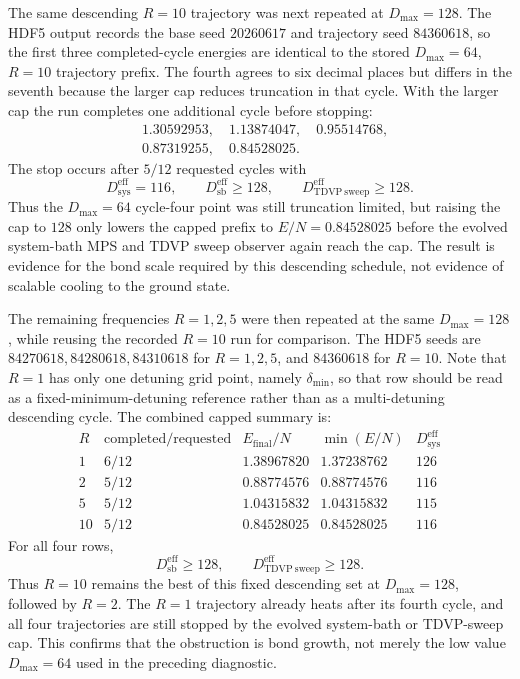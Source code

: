 \documentclass[aps,pra,twocolumn,superscriptaddress,nolongbibliography,nobalancelastpage,10pt]{revtex4-2}
\begin{document}
The same descending \(R=10\) trajectory was next repeated at
\(D_{\max}=128\).  The HDF5 output records the base seed \(20260617\) and
trajectory seed \(84360618\), so the first three completed-cycle energies are
identical to the stored \(D_{\max}=64\), \(R=10\) trajectory prefix.  The
fourth agrees to six decimal places but differs in the seventh because the
larger cap reduces truncation in that cycle.  With the larger cap the run
completes one additional cycle before stopping:
\[
\begin{aligned}
	&1.30592953,\quad 1.13874047,\quad 0.95514768,\\
	&0.87319255,\quad 0.84528025 .
\end{aligned}
\]
The stop occurs after \(5/12\) requested cycles with
\[
	D_{\mathrm{sys}}^{\mathrm{eff}}=116,\qquad
	D_{\mathrm{sb}}^{\mathrm{eff}}\geq 128,\qquad
	D_{\mathrm{TDVP\ sweep}}^{\mathrm{eff}}\geq 128 .
\]
Thus the \(D_{\max}=64\) cycle-four point was still truncation limited, but
raising the cap to \(128\) only lowers the capped prefix to
\(E/N=0.84528025\) before the evolved system-bath MPS and TDVP sweep observer
again reach the cap.  The result is evidence for the bond scale required by
this descending schedule, not evidence of scalable cooling to the ground state.

The remaining frequencies \(R=1,2,5\) were then repeated at the same
\(D_{\max}=128\), while reusing the recorded \(R=10\) run for comparison.
The HDF5 seeds are \(84270618, 84280618, 84310618\) for \(R=1,2,5\), and
\(84360618\) for \(R=10\).  Note that \(R=1\) has only one detuning grid
point, namely \(\delta_{\min}\), so that
row should be read as a fixed-minimum-detuning reference rather than as a
multi-detuning descending cycle.  The combined capped summary is:
\[
\begin{array}{c|c|c|c|c}
R & \text{completed/requested} & E_{\mathrm{final}}/N
  & \min(E/N) & D_{\mathrm{sys}}^{\mathrm{eff}}\\
\hline
1 & 6/12 & 1.38967820 & 1.37238762 & 126\\
2 & 5/12 & 0.88774576 & 0.88774576 & 116\\
5 & 5/12 & 1.04315832 & 1.04315832 & 115\\
10 & 5/12 & 0.84528025 & 0.84528025 & 116
\end{array}
\]
For all four rows,
\[
	D_{\mathrm{sb}}^{\mathrm{eff}}\geq 128,\qquad
	D_{\mathrm{TDVP\ sweep}}^{\mathrm{eff}}\geq 128 .
\]
Thus \(R=10\) remains the best of this fixed descending set at
\(D_{\max}=128\), followed by \(R=2\).  The \(R=1\) trajectory already heats
after its fourth cycle, and all four trajectories are still stopped by the
evolved system-bath or TDVP-sweep cap.  This confirms that the obstruction is
bond growth, not merely the low value \(D_{\max}=64\) used in the preceding
diagnostic.
\end{document}
